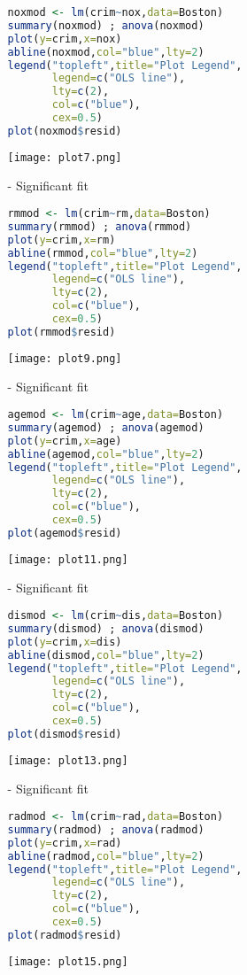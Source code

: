 \documentclass[11pt]{report}
\begin{document}
\begin{itemize}
\begin{itemize}
\begin{lstlisting}[language=R]
noxmod <- lm(crim~nox,data=Boston)
summary(noxmod) ; anova(noxmod) 
plot(y=crim,x=nox) 
abline(noxmod,col="blue",lty=2)
legend("topleft",title="Plot Legend",
       legend=c("OLS line"),
       lty=c(2),
       col=c("blue"),
       cex=0.5)
plot(noxmod$resid)
\end{lstlisting}
\texttt{[image: plot7.png]}



\item[-] Significant fit

\begin{lstlisting}[language=R]
rmmod <- lm(crim~rm,data=Boston)
summary(rmmod) ; anova(rmmod) 
plot(y=crim,x=rm) 
abline(rmmod,col="blue",lty=2)
legend("topleft",title="Plot Legend",
       legend=c("OLS line"),
       lty=c(2),
       col=c("blue"),
       cex=0.5)
plot(rmmod$resid)
\end{lstlisting}
\texttt{[image: plot9.png]}



\item[-] Significant fit

\begin{lstlisting}[language=R]
agemod <- lm(crim~age,data=Boston)
summary(agemod) ; anova(agemod) 
plot(y=crim,x=age) 
abline(agemod,col="blue",lty=2)
legend("topleft",title="Plot Legend",
       legend=c("OLS line"),
       lty=c(2),
       col=c("blue"),
       cex=0.5)
plot(agemod$resid)
\end{lstlisting}
\texttt{[image: plot11.png]}



\item[-] Significant fit

\begin{lstlisting}[language=R]
dismod <- lm(crim~dis,data=Boston)
summary(dismod) ; anova(dismod) 
plot(y=crim,x=dis) 
abline(dismod,col="blue",lty=2)
legend("topleft",title="Plot Legend",
       legend=c("OLS line"),
       lty=c(2),
       col=c("blue"),
       cex=0.5)
plot(dismod$resid)
\end{lstlisting}
\texttt{[image: plot13.png]}

\item[-] Significant fit

\begin{lstlisting}[language=R]
radmod <- lm(crim~rad,data=Boston)
summary(radmod) ; anova(radmod) 
plot(y=crim,x=rad) 
abline(radmod,col="blue",lty=2)
legend("topleft",title="Plot Legend",
       legend=c("OLS line"),
       lty=c(2),
       col=c("blue"),
       cex=0.5)
plot(radmod$resid)
\end{lstlisting}
\texttt{[image: plot15.png]}


\end{itemize}
\end{itemize}
\end{document}
